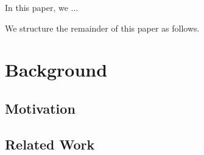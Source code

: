 \documentclass{mpaper}
\begin{document}
In this paper, we ...





We structure the remainder of this paper as follows.

%
%
\section{Background}


\subsection{Motivation}

\subsection{Related Work}


\end{document}

